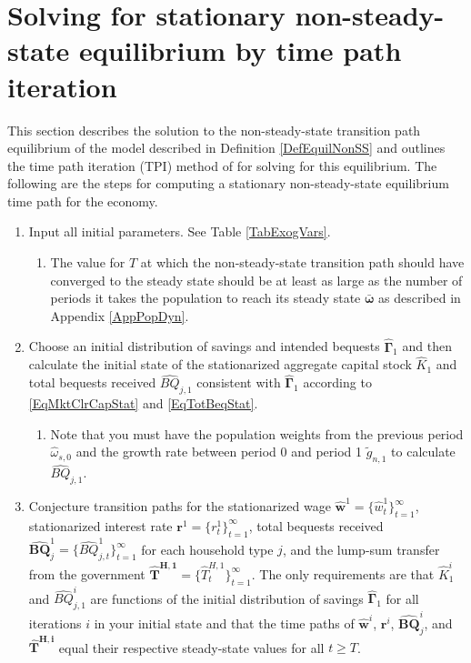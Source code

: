 \documentclass[letterpaper,12pt]{article}
\theoremstyle{definition}
\begin{document}
\newpage
\section{Solving for stationary non-steady-state equilibrium by time path iteration}\label{AppNonSSsolve}

  \setcounter{equation}{0}

  This section describes the solution to the non-steady-state transition path equilibrium of the model described in Definition \ref{DefEquilNonSS} and outlines the time path iteration (TPI) method of \citet{AuerbachKotlikoff:1987} for solving for this equilibrium. The following are the steps for computing a stationary non-steady-state equilibrium time path for the economy.
  \begin{enumerate}
    \item Input all initial parameters. See Table \ref{TabExogVars}.
      \begin{enumerate}
        \item The value for $T$ at which the non-steady-state transition path should have converged to the steady state should be at least as large as the number of periods it takes the population to reach its steady state $\bm{\bar{\omega}}$ as described in Appendix \ref{AppPopDyn}.
      \end{enumerate}
    \item Choose an initial distribution of savings and intended bequests $\bm{\hat{\Gamma}}_1$ and then calculate the initial state of the stationarized aggregate capital stock $\hat{K}_1$ and total bequests received $\hat{BQ}_{j,1}$ consistent with $\bm{\hat{\Gamma}}_1$ according to \eqref{EqMktClrCapStat} and \eqref{EqTotBeqStat}.
      \begin{enumerate}
        \item Note that you must have the population weights from the previous period $\hat{\omega}_{s,0}$ and the growth rate between period 0 and period 1 $\tilde{g}_{n,1}$ to calculate $\hat{BQ}_{j,1}$.
      \end{enumerate}
    \item Conjecture transition paths for the stationarized wage $\bm{\hat{w}}^1=\{\hat{w}^1_t\}_{t=1}^\infty$, stationarized interest rate $\bm{r}^1=\{r^1_t\}_{t=1}^\infty$, total bequests received $\bm{\hat{BQ}}_j^1=\{\hat{BQ}^{1}_{j,t}\}_{t=1}^\infty$ for each household type $j$, and the lump-sum transfer from the government $\bm{\hat{T}^{H,1}}=\{\hat{T}^{H,1}_t\}_{t=1}^\infty$. The only requirements are that $\hat{K}^i_1$ and $\hat{BQ}^i_{j,1}$ are functions of the initial distribution of savings $\bm{\hat{\Gamma}}_1$ for all iterations $i$ in your initial state and that the time paths of $\bm{\hat{w}}^i$, $\bm{r}^i$, $\bm{\hat{BQ}}_j^i$, and $\bm{\hat{T}^{H,i}}$ equal their respective steady-state values for all $t\geq T$.

\end{enumerate}
\end{document}
